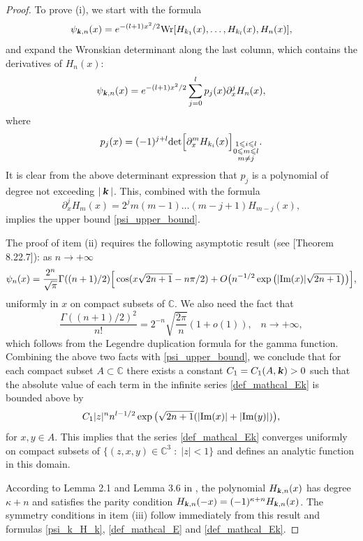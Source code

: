 \documentclass[12pt]{article}
\def\im{\textnormal {Im}}
\def\wr{\textnormal{Wr}}
\def\c{{\mathbb C}}
\def\k{\textbf{\textsl{k}}}
\begin{document}
\begin{proof}
To prove (i), we start with the formula 
\[
\psi_{\k,n}(x)=e^{-(l+1)x^2/2} \wr[H_{k_1}(x),\dots,H_{k_l}(x),H_n(x)],
\]
and expand the Wronskian determinant along the last column, which contains the derivatives of $H_n(x)$:
\begin{equation}\label{psi_k_n_sum_derivatives}
\psi_{\k,n}(x)=e^{-(l+1)x^2/2} \sum\limits_{j=0}^l p_{j}(x) \partial_x^j H_n(x),
\end{equation}
where
\[
p_{j}(x)=(-1)^{j+l} {\textnormal{det}}
\Big[ \partial_x^m H_{k_i}(x) \Big]_{\substack{1\leqslant i \leqslant l \\ 0\leqslant m \leqslant l \\ m\neq j}}.
\]
It is clear from the above determinant expression that $p_{j}$ is a polynomial of degree not exceeding $|\, \k \, |$. This, combined with the formula 
\[
\partial_x^j H_m(x)=2^j m(m-1)\dots(m-j+1) H_{m-j}(x),
\]
implies the upper bound \eqref{psi_upper_bound}. 


The proof of item (ii) requires the following asymptotic result (see \cite{Szego}[Theorem 8.22.7]):  as  $n\to +\infty$
\[
\psi_n(x) = \frac{2^n}{\sqrt{\pi}} \Gamma((n+1)/2) \Big[ \cos(x \sqrt{2n+1} - n\pi/2)+O\big(n^{-1/2} \exp\big( |\im(x)|\sqrt{2n+1}\big)\big)\Big], 
\]
uniformly in $x$ on compact subsets of $\c$. We also need the fact that 
\[
\frac{\Gamma((n+1)/2)^2}{n!}=2^{-n} \sqrt{\frac{2\pi}{n}}  (1+o(1)), \;\;\; n\to +\infty,
\]
which follows from the Legendre duplication formula for the gamma function. 
Combining the above two facts with \eqref{psi_upper_bound}, we conclude that for each compact subset $A \subset \c$ there exists a constant $C_1=C_1(A,\k)>0$ such that the absolute value of each term in the infinite series \eqref{def_mathcal_Ek} is bounded above by 
\[
C_1 |z|^n n^{l-1/2} \exp\big(\sqrt{2n+1} (|\im(x)|+|\im(y)|)\big), 
\]
for $x,y \in A$. This implies that the series \eqref{def_mathcal_Ek} converges uniformly on compact subsets of $\{(z,x,y) \in \c^3 \; : \; |z|<1\}$
and defines an analytic function in this domain. 


According to Lemma 2.1 and Lemma 3.6 in \cite{Bonneux2018}, the polynomial $H_{\k,n}(x)$ has degree $\kappa+n$ and satisfies the parity condition $H_{\k,n}(-x)=(-1)^{\kappa+n} H_{\k,n}(x)$. 
The symmetry conditions in item (iii) follow immediately from this result and formulas \eqref{psi_k_H_k}, \eqref{def_mathcal_E} and \eqref{def_mathcal_Ek}.
\end{proof}
\end{document}
